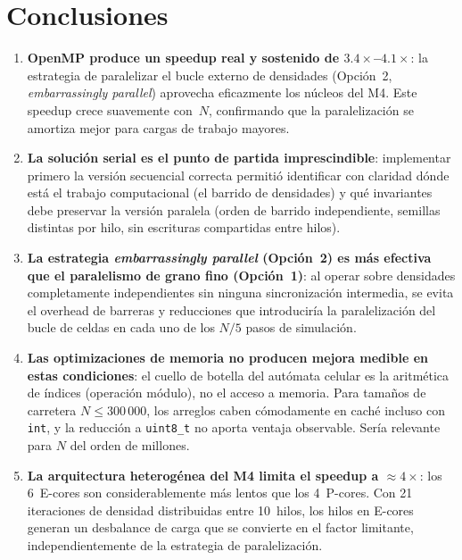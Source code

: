 \documentclass{article}
\begin{document}
\section{Conclusiones}

\begin{enumerate}

    \item \textbf{OpenMP produce un speedup real y sostenido de $3.4\times$--$4.1\times$}:
          la estrategia de paralelizar el bucle externo de densidades (Opci\'on~2,
          \emph{embarrassingly parallel}) aprovecha eficazmente los n\'ucleos del M4.
          Este speedup crece suavemente con~$N$, confirmando que la paralelizaci\'on se
          amortiza mejor para cargas de trabajo mayores.

    \item \textbf{La soluci\'on serial es el punto de partida imprescindible}: implementar
          primero la versi\'on secuencial correcta permiti\'o identificar con claridad
          d\'onde est\'a el trabajo computacional (el barrido de densidades) y qu\'e
          invariantes debe preservar la versi\'on paralela (orden de barrido independiente,
          semillas distintas por hilo, sin escrituras compartidas entre hilos).

    \item \textbf{La estrategia \emph{embarrassingly parallel} (Opci\'on~2) es m\'as
          efectiva que el paralelismo de grano fino (Opci\'on~1)}: al operar sobre
          densidades completamente independientes sin ninguna sincronizaci\'on intermedia,
          se evita el overhead de barreras y reducciones que introduciría la
          paralelizaci\'on del bucle de celdas en cada uno de los $N/5$ pasos de
          simulaci\'on.

    \item \textbf{Las optimizaciones de memoria no producen mejora medible en estas
          condiciones}: el cuello de botella del aut\'omata celular es la aritm\'etica de
          \'indices (operaci\'on m\'odulo), no el acceso a memoria. Para tama\~nos de
          carretera $N \leq 300\,000$, los arreglos caben c\'omodamente en cach\'e incluso
          con \texttt{int}, y la reducci\'on a \texttt{uint8\_t} no aporta ventaja
          observable. Ser\'ia relevante para $N$ del orden de millones.

    \item \textbf{La arquitectura heterog\'enea del M4 limita el speedup a $\approx
          4\times$}: los 6~E-cores son considerablemente m\'as lentos que los 4~P-cores.
          Con 21 iteraciones de densidad distribuidas entre 10~hilos, los hilos en E-cores
          generan un desbalance de carga que se convierte en el factor limitante,
          independientemente de la estrategia de paralelizaci\'on.


\end{enumerate}
\end{document}
